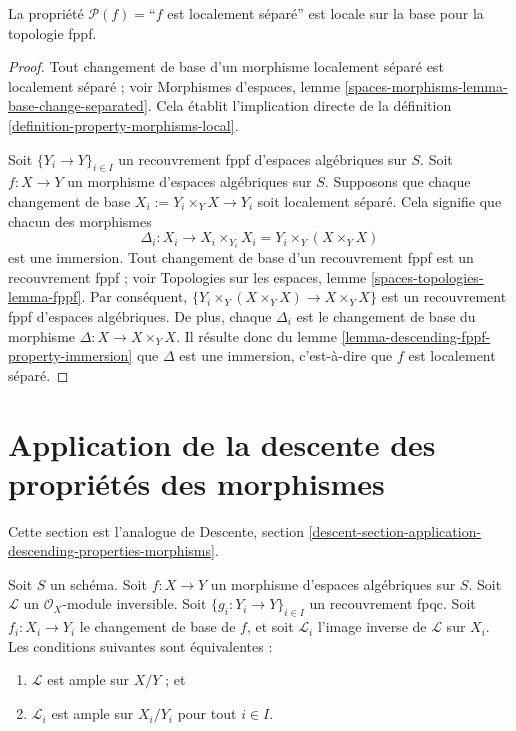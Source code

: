 \begin{lemma}
\label{lemma-descending-fppf-property-locally-separated}
La propriété $\mathcal{P}(f) =$``$f$ est localement séparé''
est locale sur la base pour la topologie fppf.
\end{lemma}

\begin{proof}
Tout changement de base d'un morphisme localement séparé est localement séparé ; voir
Morphismes d'espaces,
lemme \ref{spaces-morphisms-lemma-base-change-separated}.
Cela établit l'implication directe de la
définition \ref{definition-property-morphisms-local}.

\medskip\noindent
Soit $\{Y_i \to Y\}_{i \in I}$ un recouvrement fppf d'espaces algébriques sur $S$.
Soit $f : X \to Y$ un morphisme d'espaces algébriques sur $S$.
Supposons que chaque changement de base $X_i := Y_i \times_Y X \to Y_i$ soit localement séparé.
Cela signifie que chacun des morphismes
$$
\Delta_i :
X_i
\longrightarrow
X_i \times_{Y_i} X_i = Y_i \times_Y (X \times_Y X)
$$
est une immersion. Tout changement de base d'un recouvrement fppf est un
recouvrement fppf ; voir
Topologies sur les espaces, lemme \ref{spaces-topologies-lemma-fppf}.
Par conséquent, $\{Y_i \times_Y (X \times_Y X) \to X \times_Y X\}$
est un recouvrement fppf d'espaces algébriques. De plus, chaque
$\Delta_i$ est le changement de base du morphisme
$\Delta : X \to X \times_Y X$. Il résulte donc du
lemme \ref{lemma-descending-fppf-property-immersion}
que $\Delta$ est une immersion, c'est-à-dire que $f$ est localement séparé.
\end{proof}





\section{Application de la descente des propriétés des morphismes}
\label{section-application-descending-properties-morphisms}

\noindent
Cette section est l'analogue de Descente, section
\ref{descent-section-application-descending-properties-morphisms}.

\begin{lemma}
\label{lemma-descending-property-ample}
Soit $S$ un schéma.
Soit $f : X \to Y$ un morphisme d'espaces algébriques sur $S$.
Soit $\mathcal{L}$ un $\mathcal{O}_X$-module inversible.
Soit $\{g_i : Y_i \to Y\}_{i \in I}$ un recouvrement fpqc.
Soit $f_i : X_i \to Y_i$ le changement de base de $f$, et soit $\mathcal{L}_i$
l'image inverse de $\mathcal{L}$ sur $X_i$.
Les conditions suivantes sont équivalentes :
\begin{enumerate}
\item $\mathcal{L}$ est ample sur $X/Y$ ; et
\item $\mathcal{L}_i$ est ample sur $X_i/Y_i$
pour tout $i \in I$.
\end{enumerate}
\end{lemma}


